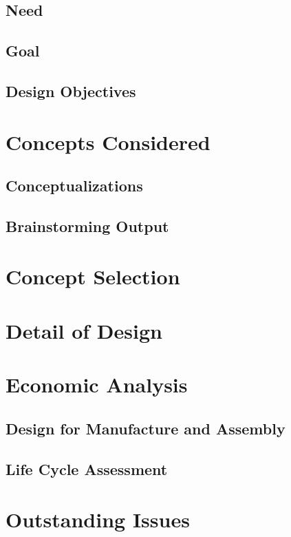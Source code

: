 \documentclass{article}
\begin{document}
\subsection{Need}

\subsection{Goal}

\subsection{Design Objectives}



\section{Concepts Considered}
\subsection{Conceptualizations}

\subsection{Brainstorming Output}


\section{Concept Selection}


\section{Detail of Design}

\section{Economic Analysis}
\subsection{Design for Manufacture and Assembly}

\subsection{Life Cycle Assessment}


\section{Outstanding Issues}
\end{document}
